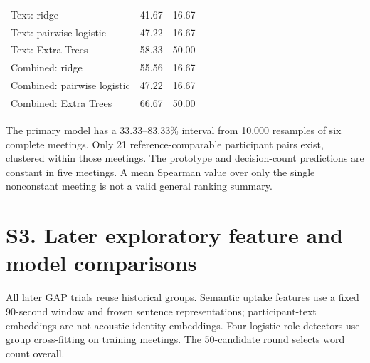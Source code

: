 \documentclass[journal,onecolumn]{IEEEtran}
\begin{document}
\begin{table}[htbp]
\begin{tabular}{p{}p{}p{}}
{\raggedright Text: ridge\par} & {\raggedright 41.67\par} & {\raggedright 16.67\par} \\
{\raggedright Text: pairwise logistic\par} & {\raggedright 47.22\par} & {\raggedright 16.67\par} \\
{\raggedright Text: Extra Trees\par} & {\raggedright 58.33\par} & {\raggedright 50.00\par} \\
{\raggedright Combined: ridge\par} & {\raggedright 55.56\par} & {\raggedright 16.67\par} \\
{\raggedright Combined: pairwise logistic\par} & {\raggedright 47.22\par} & {\raggedright 16.67\par} \\
{\raggedright Combined: Extra Trees\par} & {\raggedright 66.67\par} & {\raggedright 50.00\par} \\
\bottomrule
\end{tabular}
\end{table}
The primary model has a 33.33--83.33\% interval from 10,000 resamples of six complete meetings. Only 21 reference-comparable participant pairs exist, clustered within those meetings. The prototype and decision-count predictions are constant in five meetings. A mean Spearman value over only the single nonconstant meeting is not a valid general ranking summary.

\section*{S3. Later exploratory feature and model comparisons}
All later GAP trials reuse historical groups. Semantic uptake features use a fixed 90-second window and frozen sentence representations; participant-text embeddings are not acoustic identity embeddings. Four logistic role detectors use group cross-fitting on training meetings. The 50-candidate round selects word count overall.
\end{document}

